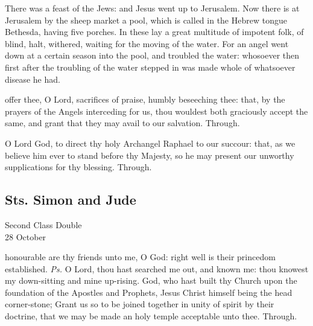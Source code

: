  There was a feast of the Jews: and Jesus went up to Jerusalem. Now there is at Jerusalem by the sheep market a pool, which is called in the Hebrew tongue Bethesda, having five porches. In these lay a great multitude of impotent folk, of blind, halt, withered, waiting for the moving of the water. For an angel went down at a certain season into the pool, and troubled the water: whosoever then first after the troubling of the water stepped in was made whole of whatsoever disease he had.


\secret
{} offer thee, O Lord, sacrifices of praise, humbly beseeching thee: that, by the prayers of the Angels interceding for us, thou wouldest both graciously accept the same, and grant that they may avail to our salvation. Through.


\postcommunion
{} O Lord God, to direct thy holy Archangel Raphael to our succour: that, as we believe him ever to stand before thy Majesty, so he may present our unworthy supplications for thy blessing. Through.


\subsection{Sts. Simon and Jude}
\begin{inhead}
    {Second Class Double\\
28 October}
\end{inhead}

\introit
{} honourable are thy friends unto me, O God: right well is their princedom established. \textit{Ps.} O Lord, thou hast searched me out, and known me: thou knowest my down-sitting and mine up-rising.
\collect
{} God, who hast built thy Church upon the foundation of the Apostles and Prophets, Jesus Christ himself being the head corner-stone; Grant us so to be joined together in unity of spirit by their doctrine, that we may be made an holy temple acceptable unto thee. Through.

